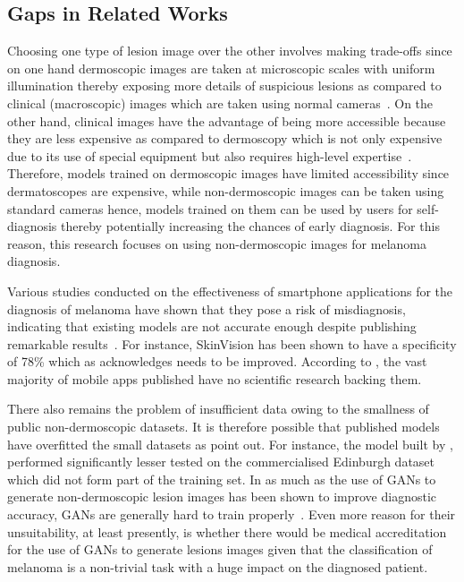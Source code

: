 \documentclass[12pt, a4paper]{article}
\begin{document}
\subsection{Gaps in Related Works}
Choosing one type of lesion image over the other involves making trade-offs since on one hand dermoscopic images are taken at microscopic scales with uniform illumination thereby exposing more details of suspicious lesions as compared to clinical (macroscopic) images which are taken using normal cameras~\citep{PEHAMBERGER1993S356}. On the other hand, clinical images have the advantage of being more accessible because they are less expensive as compared to dermoscopy which is not only expensive due to its use of special equipment but also requires high-level expertise~\citep{jafari2017extraction, jones2019dermoscopy}. Therefore, models trained on dermoscopic images have limited accessibility since dermatoscopes are expensive, while non-dermoscopic images can be taken using standard cameras hence, models trained on them can be used by users for self-diagnosis thereby potentially increasing the chances of early diagnosis. For this reason, this research focuses on using non-dermoscopic images for melanoma diagnosis.

Various studies conducted on the effectiveness of smartphone applications for the diagnosis of melanoma have shown that they pose a risk of misdiagnosis, indicating that existing models are not accurate enough despite publishing remarkable results~\citep{davis2019current, rat2018use}. For instance, SkinVision has been shown to have a specificity of 78\% which as \cite{udrea2020accuracy} acknowledges needs to be improved. According to \cite{okur2018survey}, the vast majority of mobile apps published have no scientific research backing them.

There also remains the problem of insufficient data owing to the smallness of public non-dermoscopic datasets. It is therefore possible that published models have overfitted the small datasets as \cite{yoon2019generalizable} point out. For instance, the model built by \cite{HAN20181529}, performed significantly lesser tested on the commercialised Edinburgh dataset which did not form part of the training set. In as much as the use of GANs to generate non-dermoscopic lesion images has been shown to improve diagnostic accuracy, GANs are generally hard to train properly~\citep{perez2021convolutional}. Even more reason for their unsuitability, at least presently, is whether there would be medical accreditation for the use of GANs to generate lesions images given that the classification of melanoma is a non-trivial task with a huge impact on the diagnosed patient.
\end{document}
